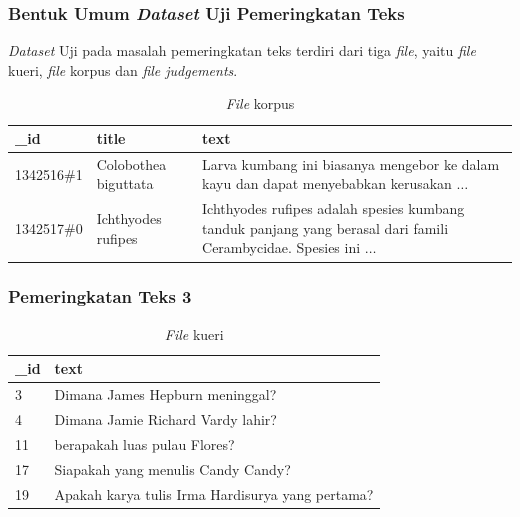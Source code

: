 \documentclass[10pt]{beamer}
\newcommand{\f}[1]{\textit{#1}}
\begin{document}
\begin{frame}
    \frametitle{Bentuk Umum \f{Dataset} Uji Pemeringkatan Teks}
    \noindent\f{Dataset} Uji pada masalah pemeringkatan teks terdiri dari tiga \f{file}, yaitu \f{file} kueri, \f{file} korpus dan \f{file judgements}.
    \begin{table}[!ht]
        \centering
        \label{tab:contoh-file-korpus}
        \caption{\f{File} korpus}
        \begin{tabular}{|l|l|p{}|}
            \hline
            \textbf{\_id}    & \textbf{title}             & \textbf{text}                                                                                                 \\ \hline
            1342516\#1  & Colobothea biguttata & Larva kumbang ini biasanya mengebor ke dalam kayu dan dapat menyebabkan kerusakan $\dots$ \\ \hline
            1342517\#0  & Ichthyodes rufipes  & Ichthyodes rufipes adalah spesies kumbang tanduk panjang yang berasal dari famili Cerambycidae. Spesies ini $\dots$ \\ \hline
        \end{tabular}
    \end{table}
\end{frame}


\begin{frame}
\frametitle{Pemeringkatan Teks 3}

    \begin{table}[!ht]
        \centering
        \caption{\f{File} kueri}
        \label{tab:query-file-example}
        \begin{tabular}{|l|p{}|}
            \hline
            \textbf{\_id} & \textbf{text}                                                                 \\ \hline
            3             & Dimana James Hepburn meninggal?                                              \\ \hline
            4             & Dimana Jamie Richard Vardy lahir?                                            \\ \hline
            11            & berapakah luas pulau Flores?                                                 \\ \hline
            17            & Siapakah yang menulis Candy Candy?                                           \\ \hline
            19            & Apakah karya tulis Irma Hardisurya yang pertama?                              \\ \hline
        \end{tabular}
    \end{table}
\end{frame}
\end{document}
